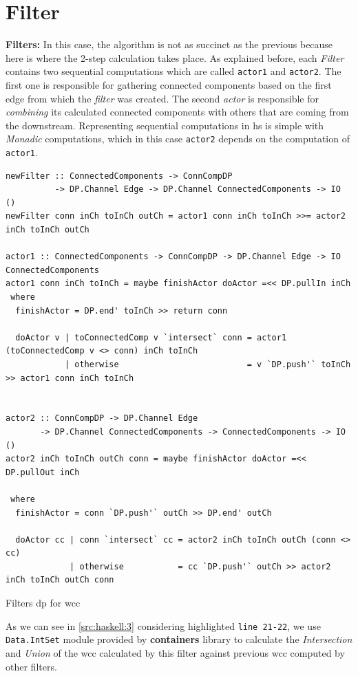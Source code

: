 \documentclass[preprint]{elsarticle}
\begin{document}
\section{Filter}\label{filter}
\textbf{Filters:}\newline
In this case, the algorithm is not as succinct as the previous because here is where the 2-step calculation takes place. As explained before, each \textit{Filter} contains two sequential computations which are called \texttt{actor1} and \texttt{actor2}. The first one is responsible for gathering connected components based on the first edge from which the \textit{filter} was created.  The second \textit{actor} is responsible for \textit{combining} its calculated connected components with others that are coming from the downstream. Representing sequential computations in \acrshort{hs} is simple with \emph{Monadic} computations, which in this case \texttt{actor2} depends on the computation of \texttt{actor1}.

\begin{listing}[H]
\begin{verbatim}
newFilter :: ConnectedComponents -> ConnCompDP 
          -> DP.Channel Edge -> DP.Channel ConnectedComponents -> IO ()
newFilter conn inCh toInCh outCh = actor1 conn inCh toInCh >>= actor2 inCh toInCh outCh

actor1 :: ConnectedComponents -> ConnCompDP -> DP.Channel Edge -> IO ConnectedComponents
actor1 conn inCh toInCh = maybe finishActor doActor =<< DP.pullIn inCh
 where
  finishActor = DP.end' toInCh >> return conn

  doActor v | toConnectedComp v `intersect` conn = actor1 (toConnectedComp v <> conn) inCh toInCh
            | otherwise                          = v `DP.push'` toInCh >> actor1 conn inCh toInCh


actor2 :: ConnCompDP -> DP.Channel Edge 
       -> DP.Channel ConnectedComponents -> ConnectedComponents -> IO ()
actor2 inCh toInCh outCh conn = maybe finishActor doActor =<< DP.pullOut inCh

 where
  finishActor = conn `DP.push'` outCh >> DP.end' outCh

  doActor cc | conn `intersect` cc = actor2 inCh toInCh outCh (conn <> cc)
             | otherwise           = cc `DP.push'` outCh >> actor2 inCh toInCh outCh conn
\end{verbatim}
\caption{Filters \acrshort{dp} for \acrshort{wcc}}
\label{src:haskell:3}
\end{listing}

As we can see in \autoref{src:haskell:3} considering highlighted \texttt{line 21-22}, we use \texttt{Data.IntSet} module provided by \textbf{containers} \cite{containers} library to calculate the \textit{Intersection} and \textit{Union} of the \acrshort{wcc} calculated by this filter against  previous \acrshort{wcc} computed by other filters.\label{not:optimal}

\fi
\end{document}

